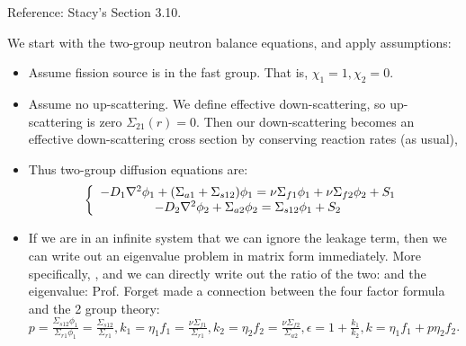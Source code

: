 \documentclass{school-22.211-notes}
\date{April 4, 2012}
\begin{document}
\maketitle

\label{2g-finite-difference}
Reference: Stacy's Section 3.10. 

We start with the two-group neutron balance equations, and apply assumptions:
\begin{itemize}
\item Assume fission source is in the fast group. That is, $\chi_1 = 1, \chi_2 = 0$. 
\item Assume no up-scattering. We define effective down-scattering, so up-scattering is zero $\Sigma_{21}(r) = 0$. Then our down-scattering becomes an effective down-scattering cross section by conserving reaction rates (as usual), 

\item Thus two-group diffusion equations are: 
  \begin{align}
    \left\{ \begin{array}{c}
      - D_1 \nabla^2 \phi_1 + (\Sigma_{a1} + \Sigma_{s12}) \phi_1 = \nu \Sigma_{f1} \phi_1 + \nu \Sigma_{f2} \phi_2 + S_1  \\
      - D_2 \nabla^2 \phi_2 + \Sigma_{a2} \phi_2 = \Sigma_{s12} \phi_1 + S_2
    \end{array} \right. \label{two-group-eq}
  \end{align} 

\item If we are in an infinite system that we can ignore the leakage term, then we can write out an eigenvalue problem in matrix form immediately. More specifically, , and we can directly write out the ratio of the two: 
 and the eigenvalue: 
 Prof. Forget made a connection between the four factor formula and the 2 group theory: $\displaystyle p = \frac{\Sigma_{s12} \phi_1}{\Sigma_{r1} \phi_1} = \frac{\Sigma_{s12}}{\Sigma_{r1}}, k_1 = \eta_1 f_1 = \frac{\nu \Sigma_{f1}}{\Sigma_{r1}}, k_2 = \eta_2 f_2 = \frac{\nu \Sigma_{f2}}{\Sigma_{a2}}, \epsilon = 1 + \frac{k_1}{k_2}, k = \eta_1 f_1 + p \eta_2 f_2$. 



\end{itemize}
\end{document}
